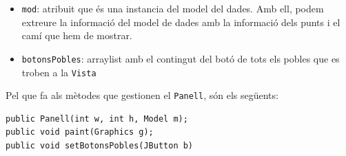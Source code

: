 \documentclass[conference]{IEEEtran}
\begin{document}
\begin{itemize}
    \item \texttt{mod}: atribuit que és una instancia del model del dades. Amb ell, podem extreure la informació del model de dades amb la informació dels punts i el camí que hem de mostrar.\\
    \item \texttt{botonsPobles}: arraylist amb el contingut del botó de tots els pobles que es troben a la \texttt{Vista}\\
\end{itemize}

Pel que fa als mètodes que gestionen el \texttt{Panell}, són els següents:
\begin{verbatim}
public Panell(int w, int h, Model m);
public void paint(Graphics g);
public void setBotonsPobles(JButton b)
\end{verbatim}
\end{document}
